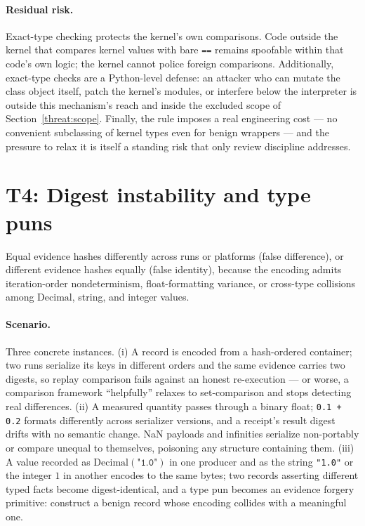\paragraph{Residual risk.} Exact-type checking protects the kernel's own comparisons. Code outside the kernel that compares kernel values with bare \texttt{==} remains spoofable within that code's own logic; the kernel cannot police foreign comparisons. Additionally, exact-type checks are a Python-level defense: an attacker who can mutate the class object itself, patch the kernel's modules, or interfere below the interpreter is outside this mechanism's reach and inside the excluded scope of Section~\ref{threat:scope}. Finally, the rule imposes a real engineering cost --- no convenient subclassing of kernel types even for benign wrappers --- and the pressure to relax it is itself a standing risk that only review discipline addresses.

\section{T4: Digest instability and type puns}\label{threat:t4}

\begin{threat}\label{threat:thr:digest}
Equal evidence hashes differently across runs or platforms (false difference), or different evidence hashes equally (false identity), because the encoding admits iteration-order nondeterminism, float-formatting variance, or cross-type collisions among $\mathrm{Decimal}$, string, and integer values.
\end{threat}

\paragraph{Scenario.} Three concrete instances. (i) A record is encoded from a hash-ordered container; two runs serialize its keys in different orders and the same evidence carries two digests, so replay comparison fails against an honest re-execution --- or worse, a comparison framework ``helpfully'' relaxes to set-comparison and stops detecting real differences. (ii) A measured quantity passes through a binary float; \texttt{0.1 + 0.2} formats differently across serializer versions, and a receipt's result digest drifts with no semantic change. NaN payloads and infinities serialize non-portably or compare unequal to themselves, poisoning any structure containing them. (iii) A value recorded as $\mathrm{Decimal}(\texttt{"1.0"})$ in one producer and as the string \texttt{"1.0"} or the integer $1$ in another encodes to the same bytes; two records asserting different typed facts become digest-identical, and a type pun becomes an evidence forgery primitive: construct a benign record whose encoding collides with a meaningful one.

